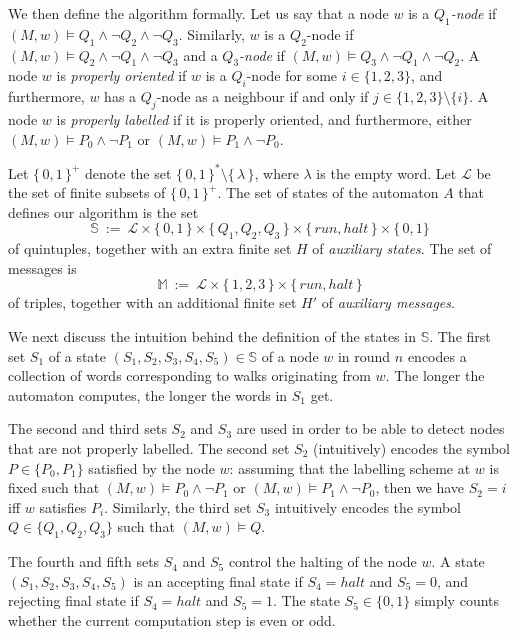 \documentclass[copyright,creativecommons]{eptcs}
\begin{document}
We then define the algorithm formally.
Let us say that a node $w$
is a \emph{$Q_1$-node} if $(M,w)\models Q_1 \wedge \neg Q_2\wedge \neg Q_3$.
Similarly, $w$ is a \emph{$Q_2$}-node if
$(M,w)\models Q_2 \wedge \neg Q_1\wedge \neg Q_3$
and a \emph{$Q_3$-node} if
$(M,w)\models Q_3 \wedge \neg Q_1\wedge \neg Q_2$.
A node $w$ is \emph{properly oriented} if $w$ is a $Q_i$-node for some $i\in\{1,2,3\}$,
and furthermore, $w$ has a $Q_j$-node as a neighbour if and only if $j\in\{1,2,3\}\setminus\{i\}$.
A node $w$ is \emph{properly labelled} if it is properly oriented, and furthermore, 
either $(M,w)\models P_0\wedge\neg P_1$ or $(M,w)\models P_1\wedge\neg P_0$.




Let $\{\, 0,1\, \}^+$ denote the set $\{\, 0,1\, \}^*\setminus\{\, \lambda\, \}$, where $\lambda$ is the empty word.
Let $\mathcal{L}$ be the set of finite subsets of $\{\, 0,1\, \}^+$.
The set of states of the automaton $A$ that defines our algorithm is the set
$$\mathbb{S}\ :=\ \mathcal{L}\times\{\, 0,1\, \}
\times\{\, Q_1,Q_2,Q_3\, \}\times\{\, \mathit{run},\mathit{halt}\, \}\times\{\, 0,1\}$$
of quintuples, together with an extra finite set $H$ of \emph{auxiliary states}.
The set of messages is
$$\mathbb{M}\ :=\ \mathcal{L}\times\{\, 1,2,3\, \}\times \{\, \mathit{run},\mathit{halt}\, \}$$
of triples, together with an additional finite set $H'$ of \emph{auxiliary messages}.




We next discuss the intuition behind the definition of the states in $\mathbb{S}$.
The first set $S_1$ of a state 
$(S_1,S_2,S_3,S_4,S_5)\in\mathbb{S}$ of a node $w$ in round $n$ encodes a collection of words corresponding to
walks originating from $w$.
The longer the automaton computes, the longer the words in $S_1$ get.




The second and third sets $S_2$ and $S_3$ are used in order to be able to detect nodes that are not properly labelled.
The second set $S_2$ (intuitively) encodes the symbol $P\in \{P_0,P_1\}$ satisfied by the node $w$:
assuming that the labelling scheme at $w$ is 
fixed such that $(M,w)\models P_0 \wedge \neg P_1$ or
$(M,w)\models P_1 \wedge \neg P_0$, then we have $S_2 = i$ iff $w$ satisfies $P_i$.
Similarly, the third set $S_3$ intuitively encodes the symbol $Q\in \{Q_1,Q_2,Q_3\}$ such that $(M,w)\models Q$.




The fourth and fifth sets $S_4$ and $S_5$ control the halting of the node $w$.
A state $(S_1,S_2,S_3,S_4,S_5)$ is an accepting final state if $S_4 =\mathit{halt}$ and $S_5 = 0$,
and rejecting final state if $S_4 =\mathit{halt}$ and $S_5 = 1$.
The state $S_5\in \{0,1\}$ simply counts whether the current computation step is even or odd.
\end{document}
